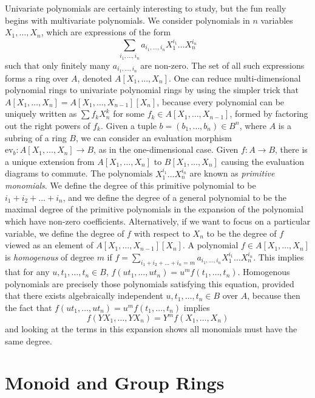 Univariate polynomials are certainly interesting to study, but the fun really begins with multivariate polynomials. We consider polynomials in $n$ variables $X_1, \dots, X_n$, which are expressions of the form
%
\[ \sum_{i_1, \dots, i_n} a_{i_1, \dots, i_n} X_1^{i_1} \dots X_n^{i_n} \]
%
such that only finitely many $a_{i_1, \dots, i_n}$ are non-zero. The set of all such expressions forms a ring over $A$, denoted $A[X_1, \dots, X_n]$. One can reduce multi-dimensional polynomial rings to univariate polynomial rings by using the simpler trick that $A[X_1, \dots, X_n] = A[X_1, \dots, X_{n-1}][X_n]$, because every polynomial can be uniquely written as $\sum f_k X_n^k$ for some $f_k \in A[X_1, \dots, X_{n-1}]$, formed by factoring out the right powers of $f_k$. Given a tuple $b = (b_1, \dots, b_n) \in B^n$, where $A$ is a subring of a ring $B$, we can consider an evaluation morphism $\text{ev}_b: A[X_1, \dots, X_n] \to B$, as in the one-dimensional case. Given $f: A \to B$, there is a unique extension from $A[X_1, \dots, X_n]$ to $B[X_1, \dots, X_n]$ causing the evaluation diagrams to commute. The polynomials $X_1^{i_1} \dots X_n^{i_n}$ are known as {\it primitive monomials}. We define the degree of this primitive polynomial to be $i_1 + i_2 + \dots + i_n$, and we define the degree of a general polynomial to be the maximal degree of the primitive polynomials in the expansion of the polynomial which have non-zero coefficients. Alternatively, if we want to focus on a particular variable, we define the degree of $f$ with respect to $X_n$ to be the degree of $f$ viewed as an element of $A[X_1, \dots, X_{n-1}][X_n]$. A polynomial $f \in A[X_1, \dots, X_n]$ is {\it homogenous} of degree $m$ if $f = \sum_{i_1 + i_2 + \dots + i_n = m} a_{i_1, \dots, i_n} X_1^{i_1} \dots X_n^{i_n}$. This implies that for any $u,t_1, \dots, t_n \in B$, $f(ut_1, \dots, ut_n) = u^m f(t_1, \dots, t_n)$. Homogenous polynomials are precisely those polynomials satisfying this equation, provided that there exists algebraically independent $u, t_1, \dots, t_n \in B$ over $A$, because then the fact that $f(ut_1, \dots, ut_n) = u^m f(t_1, \dots, t_n)$ implies
%
\[ f(YX_1, \dots, YX_n) = Y^m f(X_1, \dots, X_n) \]
%
and looking at the terms in this expansion shows all monomials must have the same degree.

\section{Monoid and Group Rings}

